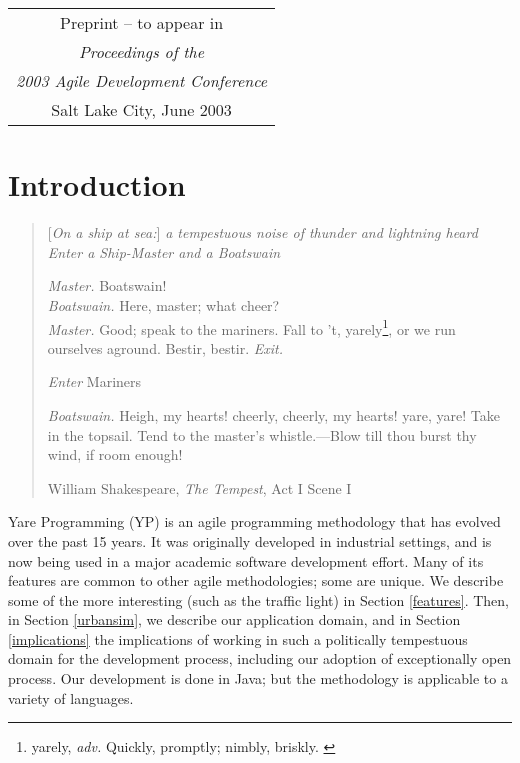 \documentclass[times, 10pt,twocolumn]{article}
\begin{document}
\begin{tabular}{|c|} \hline
Preprint -- to appear in \\
\emph{Proceedings of the} \\
\emph{2003 Agile Development Conference} \\
Salt Lake City, June 2003 \\
\hline
\end{tabular}

\newpage

\section{Introduction}
\label{introduction}

\begin{quote}
\begin{center}
[\emph{On a ship at sea:}] \emph{a tempestuous noise of thunder and lightning
heard} \\
\emph{Enter a {\rm Ship-Master} and a {\rm Boatswain}}
\end{center}

\emph{Master.} B{\sc oatswain}! \\
\emph{Boatswain.} Here, master; what cheer? \\
\emph{Master.} Good; speak to the mariners.  Fall to 't, 
yarely\footnote{yarely, \emph{adv.} Quickly, promptly; nimbly, briskly.
\cite{oed-2003}},
or we run ourselves aground.  Bestir, bestir.  \emph{Exit.}

\begin{center}
\emph{Enter} Mariners
\end{center}

\emph{Boatswain.} Heigh, my hearts!  cheerly, cheerly, my hearts! yare, yare!
Take in the topsail.  Tend to the master's whistle.---Blow till thou burst
thy wind, if room enough!

\begin{center}
William Shakespeare, \emph{The Tempest}, Act I Scene I
\end{center}
\end{quote}

Yare Programming (YP) is an agile programming methodology that has evolved
over the past 15 years.  It was originally developed in industrial
settings, and is now being used in a major academic software development
effort.  Many of its features are common to other agile methodologies; some
are unique.  We describe some of the more interesting (such as the traffic
light) in Section \ref{features}.  Then, in Section \ref{urbansim}, we
describe our application domain, and in Section \ref{implications} the
implications of working in such a politically tempestuous domain for the
development process, including our adoption of exceptionally open process.
Our development is done in Java; but the methodology is applicable to a
variety of languages.
\end{document}
